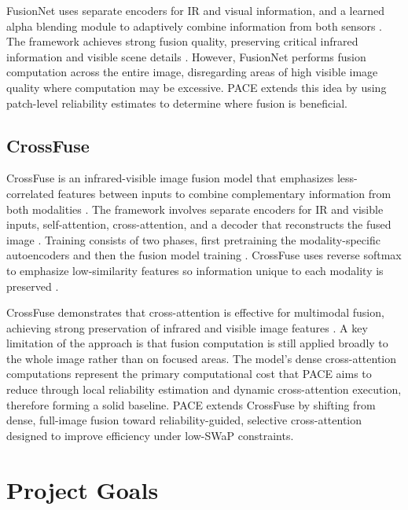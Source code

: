 \documentclass[conference]{IEEEtran}
\begin{document}
\indent FusionNet uses separate encoders for IR and visual information, and a learned alpha blending module to adaptively combine information from both sensors \cite{fusionnet2025}. The framework achieves strong fusion quality, preserving critical infrared information and visible scene details \cite{fusionnet2025}. However, FusionNet performs fusion computation across the entire image, disregarding areas of high visible image quality where computation may be excessive. PACE extends this idea by using patch-level reliability estimates to determine where fusion is beneficial.

\subsection{CrossFuse}

CrossFuse is an infrared-visible image fusion model that emphasizes less-correlated features between inputs to combine complementary information from both modalities \cite{crossfuse2024}. The framework involves separate encoders for IR and visible inputs, self-attention, cross-attention, and a decoder that reconstructs the fused image \cite{crossfuse2024}. Training consists of two phases, first pretraining the modality-specific autoencoders and then the fusion model training \cite{crossfuse2024}. CrossFuse uses reverse softmax to emphasize low-similarity features so information unique to each modality is preserved \cite{crossfuse2024}. \

\indent
CrossFuse demonstrates that cross-attention is effective for multimodal fusion, achieving strong preservation of infrared and visible image features \cite{crossfuse2024}. A key limitation of the approach is that fusion computation is still applied broadly to the whole image rather than on focused areas. The model's dense cross-attention computations represent the primary computational cost that PACE aims to reduce through local reliability estimation and dynamic cross-attention execution, therefore forming a solid baseline. PACE extends CrossFuse by shifting from dense, full-image fusion toward reliability-guided, selective cross-attention designed to improve efficiency under low-SWaP constraints.

\color{black}
\section{Project Goals}
\color{black}
\end{document}
